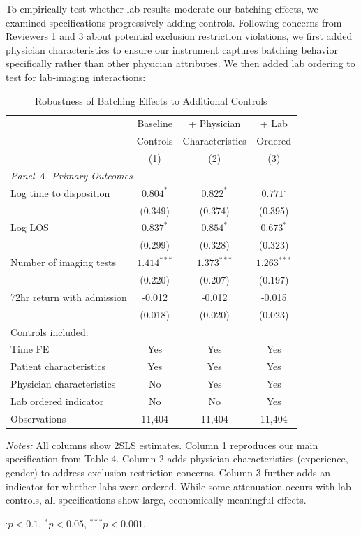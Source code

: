 \documentclass[11pt]{article}
\newcommand{\1}{\hbox{\rm 1\kern-.35em 1}}
\begin{document}
{To empirically test whether lab results moderate our batching effects, we examined specifications progressively adding controls. Following concerns from Reviewers 1 and 3 about potential exclusion restriction violations, we first added physician characteristics to ensure our instrument captures batching behavior specifically rather than other physician attributes. We then added lab ordering to test for lab-imaging interactions:

\begin{table}[h]
\centering
\caption*{Robustness of Batching Effects to Additional Controls}
\begin{threeparttable}
\begin{tabular}{lccc}
\toprule
& Baseline & + Physician & + Lab \\
& Controls & Characteristics & Ordered \\
& (1) & (2) & (3) \\
\midrule
\multicolumn{4}{l}{\textit{Panel A. Primary Outcomes}} \\[0.5em]
Log time to disposition & $0.804^{*}$ & $0.822^{*}$ & $0.771^{.}$ \\
& (0.349) & (0.374) & (0.395) \\[0.5em]
Log LOS & $0.837^{*}$ & $0.854^{*}$ & $0.673^{*}$ \\
& (0.299) & (0.328) & (0.323) \\[0.5em]
Number of imaging tests & $1.414^{***}$ & $1.373^{***}$ & $1.263^{***}$ \\
& (0.220) & (0.207) & (0.197) \\[0.5em]
72hr return with admission & -0.012 & -0.012 & -0.015 \\
& (0.018) & (0.020) & (0.023) \\[0.5em]
\midrule
Controls included: \\
Time FE & Yes & Yes & Yes \\
Patient characteristics & Yes & Yes & Yes \\
Physician characteristics & No & Yes & Yes \\
Lab ordered indicator & No & No & Yes \\
\midrule
Observations & 11,404 & 11,404 & 11,404 \\
\bottomrule
\end{tabular}
\begin{tablenotes}
\footnotesize
\item \textit{Notes:} All columns show 2SLS estimates. Column 1 reproduces our main specification from Table 4. Column 2 adds physician characteristics (experience, gender) to address exclusion restriction concerns. Column 3 further adds an indicator for whether labs were ordered. While some attenuation occurs with lab controls, all specifications show large, economically meaningful effects.
\item $^{.} p < 0.1$, $^{*} p < 0.05$, $^{***} p < 0.001$.
\end{tablenotes}
\end{threeparttable}
\end{table}

}
\end{document}
